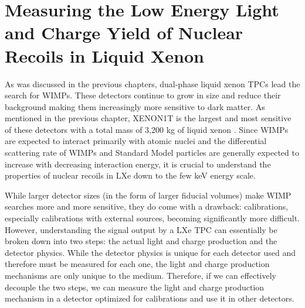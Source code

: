 

\pagestyle{cu}
\graphicspath{{./Chapter4/images/}}

\chapter[Measuring the Low Energy Light and Charge Yield of Nuclear Recoils in Liquid Xenon][Measuring the Low Energy Light and Charge Yield of Nuclear Recoils in Liquid Xenon]{Measuring the Low Energy Light and Charge Yield of Nuclear Recoils in Liquid Xenon}
\label{chap:nerix}


As was discussed in the previous chapters, dual-phase liquid xenon TPCs lead the search for WIMPs.  These detectors continue to grow in size and reduce their background making them increasingly more sensitive to dark matter.  As mentioned in the previous chapter, XENON1T is the largest and most sensitive of these detectors with a total mass of 3,200 kg of liquid xenon \cite{aprile2017first}.  Since WIMPs are expected to interact primarily with atomic nuclei and the differential scattering rate of WIMPs and Standard Model particles are generally expected to increase with decreasing interaction energy, it is crucial to understand the properties of nuclear recoils in LXe down to the few keV energy scale.  

While larger detector sizes (in the form of larger fiducial volumes) make WIMP searches more and more sensitive, they do come with a drawback: calibrations, especially calibrations with external sources, becoming significantly more difficult.   However, understanding the signal output by a LXe TPC can essentially be broken down into two steps: the actual light and charge production and the detector physics.  While the detector physics is unique for each detector used and therefore must be measured for each one, the light and charge production mechanisms are only unique to the medium.  Therefore, if we can effectively decouple the two steps, we can measure the light and charge production mechanism in a detector optimized for calibrations and use it in other detectors.  

